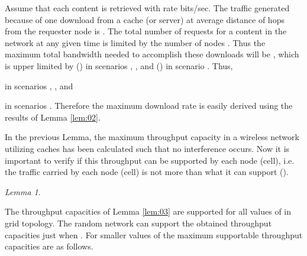 \documentclass[journal]{IEEEtran}
\theoremstyle{plain}
\theoremstyle{remark}
\newtheorem{lemma}{Lemma}
\begin{document}
\begin{IEEEproof}
Assume that each content is retrieved with rate  bits/sec. The traffic generated because of one download from a cache (or server) at average distance of  hops from the requester node is . The total number of requests for a content in the network at any given time is limited by the number of nodes . Thus the maximum total bandwidth needed to accomplish these downloads will be , which is upper limited by () in scenarios , , and () in scenario . Thus,



in scenarios , , and



in scenarios . Therefore the maximum download rate is easily derived using the results of Lemma \ref{lem:02}.
\end{IEEEproof}

In the previous Lemma, the maximum throughput capacity in a wireless network utilizing caches has been calculated such that no interference occurs. Now it is important to verify if this throughput can be supported by each node (cell), i.e. the traffic carried by each node (cell) is not more than what it can support ().

\begin{lemma} \label{lem:04}

	The throughput capacities of Lemma \ref{lem:03} are supported for all values of  in grid topology. The random network can support the obtained throughput capacities just when . For smaller values of  the maximum supportable throughput capacities are as follows.
	
\end{lemma}
\end{document}
